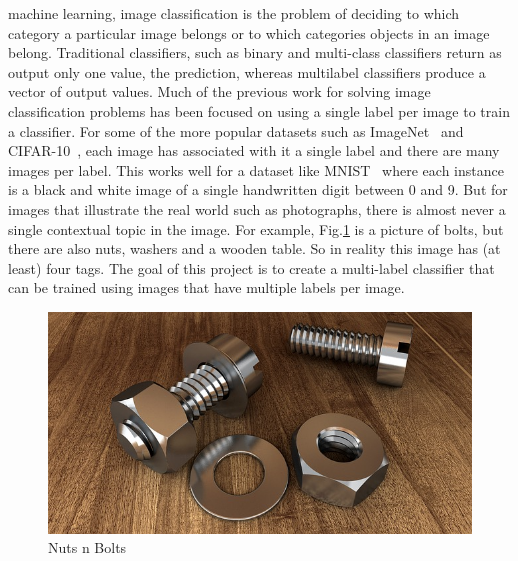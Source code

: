 \documentclass[12pt,journal,compsoc]{IEEEtran}
\begin{document}
 

 machine learning, image classification is the problem of deciding to which category a particular image belongs or to which categories objects in an image belong. Traditional classifiers, such as binary and multi-class classifiers return as output only one value, the prediction, whereas multilabel classifiers produce a vector of output values. Much of the previous work for solving image classification problems has been focused on using a single label per image to train a classifier.  For some of the more popular datasets such as ImageNet~\cite{ILSVRC15} and CIFAR-10~\cite{Krizhevsky2009}, each image has associated with it a single label and there are many images per label. This works well for a dataset like MNIST~\cite{mnist} where each instance is a black and white image of a single handwritten digit between 0 and 9.  But for images that illustrate the real world such as photographs, there is almost never a single contextual topic in the image. For example, Fig.\ref{screw-1924174_640} is a picture of bolts, but there are also nuts, washers and a wooden table.  So in reality this image has (at least) four tags.  The goal of this project is to create a multi-label classifier that can be trained using images that have multiple labels per image.

\begin{figure}
	\includegraphics[width=\linewidth]{screw-1924174_640.jpg} %
	\caption{Nuts n Bolts} %
	\label{screw-1924174_640} %
\end{figure}


\end{document}
